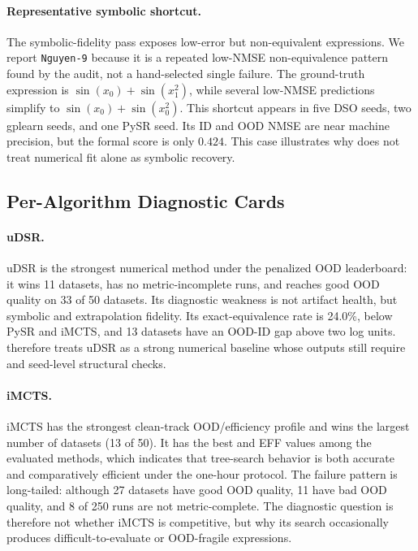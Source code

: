 \paragraph{Representative symbolic shortcut.}
The symbolic-fidelity pass exposes low-error but non-equivalent expressions. We report \texttt{Nguyen-9} because it is a repeated low-NMSE non-equivalence pattern found by the audit, not a hand-selected single failure. The ground-truth expression is $\sin(x_0)+\sin(x_1^2)$, while several low-NMSE predictions simplify to $\sin(x_0)+\sin(x_0^2)$. This shortcut appears in five DSO seeds, two gplearn seeds, and one PySR seed. Its ID and OOD NMSE are near machine precision, but the formal \symf{} score is only $0.424$. This case illustrates why \arena{} does not treat numerical fit alone as symbolic recovery.

\subsection{Per-Algorithm Diagnostic Cards}

\paragraph{uDSR.}
uDSR is the strongest numerical method under the penalized OOD leaderboard: it wins 11 datasets, has no metric-incomplete runs, and reaches good OOD quality on 33 of 50 datasets. Its diagnostic weakness is not artifact health, but symbolic and extrapolation fidelity. Its exact-equivalence rate is 24.0\%, below PySR and iMCTS, and 13 datasets have an OOD-ID gap above two log units. \arena{} therefore treats uDSR as a strong numerical baseline whose outputs still require \symf{} and seed-level structural checks.

\paragraph{iMCTS.}
iMCTS has the strongest clean-track OOD/efficiency profile and wins the largest number of datasets (13 of 50). It has the best \oodg{} and EFF values among the evaluated methods, which indicates that tree-search behavior is both accurate and comparatively efficient under the one-hour protocol. The failure pattern is long-tailed: although 27 datasets have good OOD quality, 11 have bad OOD quality, and 8 of 250 runs are not metric-complete. The diagnostic question is therefore not whether iMCTS is competitive, but why its search occasionally produces difficult-to-evaluate or OOD-fragile expressions.

